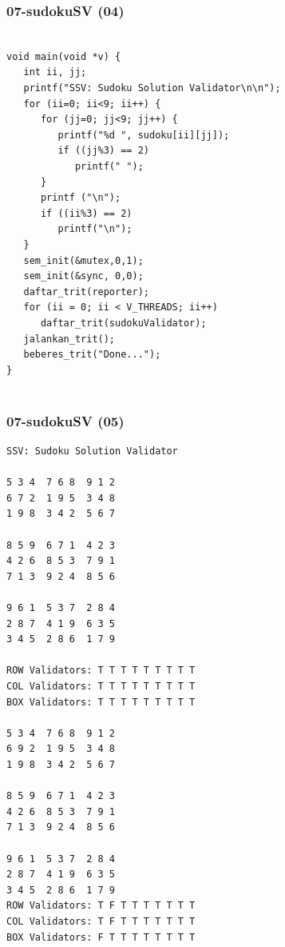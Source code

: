 \documentclass[xcolor=table, notheorems, hyperref={pdfpagelabels=false}]{beamer}
\begin{document}
\begin{frame}[fragile]
\frametitle{07-sudokuSV (04)}
\begin{lstlisting}[basicstyle=\ttfamily\tiny]

void main(void *v) {
   int ii, jj;
   printf("SSV: Sudoku Solution Validator\n\n");
   for (ii=0; ii<9; ii++) {
      for (jj=0; jj<9; jj++) {
         printf("%d ", sudoku[ii][jj]);
         if ((jj%3) == 2)
            printf(" ");
      }
      printf ("\n");
      if ((ii%3) == 2)
         printf("\n");
   }
   sem_init(&mutex,0,1);
   sem_init(&sync, 0,0); 
   daftar_trit(reporter);
   for (ii = 0; ii < V_THREADS; ii++)
      daftar_trit(sudokuValidator);
   jalankan_trit();
   beberes_trit("Done...");
}


\end{lstlisting}
\end{frame}

\begin{frame}[fragile]
\frametitle{07-sudokuSV (05)}
\begin{lstlisting}[basicstyle=\ttfamily\tiny]
SSV: Sudoku Solution Validator

5 3 4  7 6 8  9 1 2  
6 7 2  1 9 5  3 4 8  
1 9 8  3 4 2  5 6 7  

8 5 9  6 7 1  4 2 3  
4 2 6  8 5 3  7 9 1  
7 1 3  9 2 4  8 5 6  

9 6 1  5 3 7  2 8 4  
2 8 7  4 1 9  6 3 5  
3 4 5  2 8 6  1 7 9  

ROW Validators: T T T T T T T T T 
COL Validators: T T T T T T T T T 
BOX Validators: T T T T T T T T T 

5 3 4  7 6 8  9 1 2  
6 9 2  1 9 5  3 4 8  
1 9 8  3 4 2  5 6 7  

8 5 9  6 7 1  4 2 3  
4 2 6  8 5 3  7 9 1  
7 1 3  9 2 4  8 5 6  

9 6 1  5 3 7  2 8 4  
2 8 7  4 1 9  6 3 5  
3 4 5  2 8 6  1 7 9  
ROW Validators: T F T T T T T T T 
COL Validators: T F T T T T T T T 
BOX Validators: F T T T T T T T T 

\end{lstlisting}
\end{frame}
\end{document}
